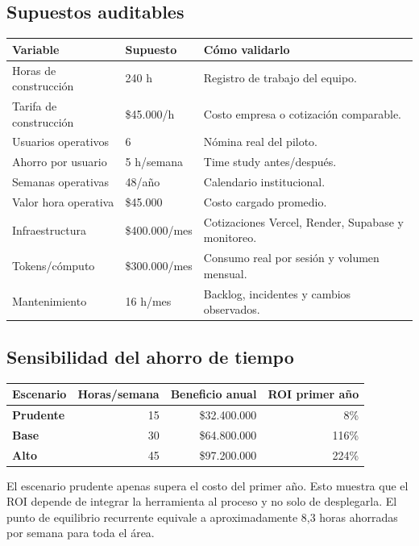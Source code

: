 \documentclass[11pt,letterpaper]{article}
\begin{document}
\subsection*{Supuestos auditables}
\begin{longtable}{p{}p{}p{}}
\toprule
\textbf{Variable} & \textbf{Supuesto} & \textbf{Cómo validarlo}\\
\midrule
\endhead
Horas de construcción & 240 h & Registro de trabajo del equipo.\\
Tarifa de construcción & \$45.000/h & Costo empresa o cotización comparable.\\
Usuarios operativos & 6 & Nómina real del piloto.\\
Ahorro por usuario & 5 h/semana & Time study antes/después.\\
Semanas operativas & 48/año & Calendario institucional.\\
Valor hora operativa & \$45.000 & Costo cargado promedio.\\
Infraestructura & \$400.000/mes & Cotizaciones Vercel, Render, Supabase y monitoreo.\\
Tokens/cómputo & \$300.000/mes & Consumo real por sesión y volumen mensual.\\
Mantenimiento & 16 h/mes & Backlog, incidentes y cambios observados.\\
\bottomrule
\end{longtable}

\subsection*{Sensibilidad del ahorro de tiempo}
\begin{center}
\begin{tabularx}{\textwidth}{>{\bfseries}X r r r}
\toprule
Escenario & Horas/semana & Beneficio anual & ROI primer año\\
\midrule
Prudente & 15 & \$32.400.000 & 8\%\\
Base & 30 & \$64.800.000 & 116\%\\
Alto & 45 & \$97.200.000 & 224\%\\
\bottomrule
\end{tabularx}
\end{center}

El escenario prudente apenas supera el costo del primer año. Esto muestra que
el ROI depende de integrar la herramienta al proceso y no solo de desplegarla.
El punto de equilibrio recurrente equivale a aproximadamente 8,3 horas ahorradas
por semana para toda el área.
\end{document}
